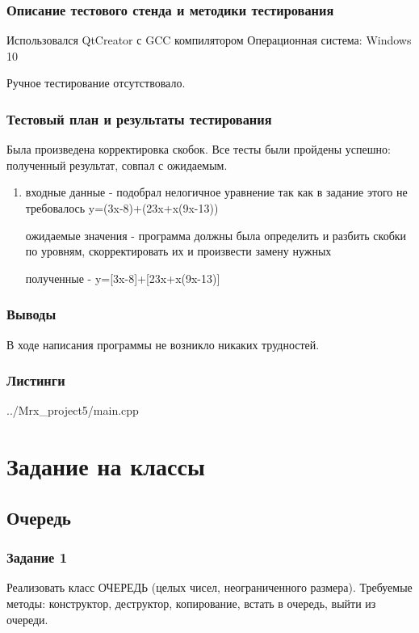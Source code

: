 \documentclass[12pt,a4paper]{report}
\begin{document}
\subsection{Описание тестового стенда и методики тестирования}
Использовался QtCreator с GCC компилятором
Операционная система: Windows 10


Ручное тестирование отсутствовало.


\subsection{Тестовый план и результаты тестирования}

Была произведена корректировка скобок. Все тесты были пройдены успешно: полученный результат, совпал с ожидаемым.

\begin{enumerate}
\item входные данные - подобрал нелогичное уравнение так как в задание этого не требовалось y=(3x-8)+(23x+x(9x-13))

ожидаемые значения - программа должны была определить и разбить скобки по уровням, скорректировать их и произвести замену нужных

полученные - y=[3x-8]+[23x+x(9x-13)]

\end{enumerate}
\subsection{Выводы}

В ходе написания программы не возникло никаких трудностей.

\subsection*{Листинги}

{../Mrx_project5/main.cpp}

\chapter{Задание на классы}

\section{Очередь}

\subsection{Задание 1}
Реализовать класс ОЧЕРЕДЬ (целых чисел, неограниченного размера). Требуемые методы: конструктор, деструктор, копирование, встать в очередь, выйти из очереди.
\end{document}
